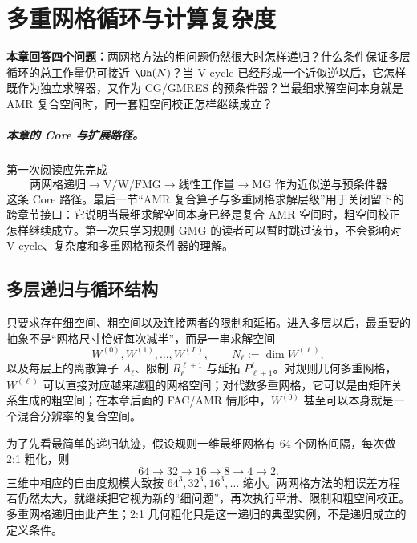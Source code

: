 \chapter{多重网格循环与计算复杂度}
\label{ch:mg-cycles}

\begin{keybox}
\textbf{本章回答四个问题：}两网格方法的粗问题仍然很大时怎样递归？什么条件保证多层循环的总工作量仍可接近 $\Oh(N)$？当 V-cycle 已经形成一个近似逆以后，它怎样既作为独立求解器，又作为 CG/GMRES 的预条件器？当最细求解空间本身就是 AMR 复合空间时，同一套粗空间校正怎样继续成立？
\end{keybox}

\paragraph{本章的 Core 与扩展路径。}
第一次阅读应先完成
\begin{equation}
\boxed{
\text{两网格递归}
\rightarrow
\text{V/W/FMG}
\rightarrow
\text{线性工作量}
\rightarrow
\text{MG 作为近似逆与预条件器}
}
\label{eq:mg-cycles-core-path}
\end{equation}
这条 Core 路径。最后一节“AMR 复合算子与多重网格求解层级”用于关闭留下的跨章节接口：它说明当最细求解空间本身已经是复合 AMR 空间时，粗空间校正怎样继续成立。第一次只学习规则 GMG 的读者可以暂时跳过该节，不会影响对 V-cycle、复杂度和多重网格预条件器的理解。

\section{多层递归与循环结构}

只要求存在细空间、粗空间以及连接两者的限制和延拓。进入多层以后，最重要的抽象不是“网格尺寸恰好每次减半”，而是一串求解空间
\begin{equation}
W^{(0)},W^{(1)},\ldots,W^{(L)},
\qquad
N_\ell:=\dim W^{(\ell)},
\label{eq:mg-solver-space-hierarchy}
\end{equation}
以及每层上的离散算子 $A_\ell$、限制 $R_\ell^{\ell+1}$ 与延拓 $P_{\ell+1}^{\ell}$。对规则几何多重网格，$W^{(\ell)}$ 可以直接对应越来越粗的网格空间；对代数多重网格，它可以是由矩阵关系生成的粗空间；在本章后面的 FAC/AMR 情形中，$W^{(0)}$ 甚至可以本身就是一个混合分辨率的复合空间。

为了先看最简单的递归轨迹，假设规则一维最细网格有 $64$ 个网格间隔，每次做 2:1 粗化，则
\begin{equation}
64\rightarrow32\rightarrow16\rightarrow8\rightarrow4\rightarrow2.
\end{equation}
三维中相应的自由度规模大致按 $64^3,32^3,16^3,\ldots$ 缩小。两网格方法的粗误差方程若仍然太大，就继续把它视为新的“细问题”，再次执行平滑、限制和粗空间校正。多重网格递归由此产生；2:1 几何粗化只是这一递归的典型实例，不是递归成立的定义条件。

